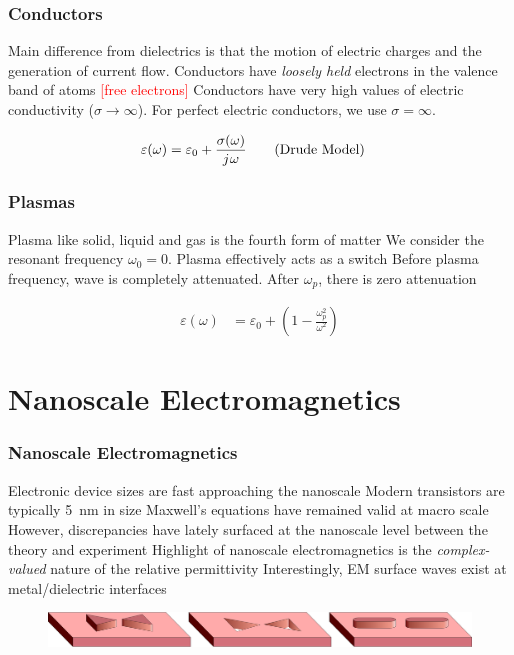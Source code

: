 \documentclass[10pt, compress]{beamer}
\renewcommand{\O}{\omega}  %
\newcommand{\E}{\varepsilon}  %
\renewcommand{\inf}{\infty}  %
\renewcommand{\j}{{j}\mkern1mu} %
\begin{document}
\begin{frame}
  \frametitle{Conductors} 
  \begin{outline}
    \1 Main difference from dielectrics is that the motion of electric charges and the  generation of current flow.
    \1 Conductors have \textit{loosely held} electrons in the valence band of atoms \textcolor{red}{[free electrons]}
    \1 Conductors have very high values of electric conductivity ($\sigma \to \inf$).
    \1 For perfect electric conductors, we use $\sigma = \inf$.
  \end{outline} 
    \begin{align*}
    \E (\O) &= \E_0 + \frac{\sigma (\O)}{\j \O} \tag{Drude Model}
  \end{align*}
\end{frame}

\begin{frame}
  \frametitle{Plasmas}
  \begin{outline}
    \1 Plasma like solid, liquid and gas is the fourth form of matter
    \1 We consider the resonant frequency $\O_0 = 0$.
    \1 Plasma effectively acts as a switch
      \2 Before plasma frequency, wave is completely attenuated.
      \2 After $\O_p$, there is zero attenuation
  \end{outline}
  \begin{align*}
    \E (\O) &= \E_0 + \left( 1 - \frac{\O_p^2}{\O^2} \right)
  \end{align*}
\end{frame}


\section{Nanoscale Electromagnetics}
\begin{frame}
  \frametitle{Nanoscale Electromagnetics}
  \begin{outline}
    \1 Electronic device sizes are fast approaching the nanoscale
    \2 Modern transistors are typically \SI{5}{\nm} in size
    \1 Maxwell's equations have remained valid at macro scale
    \2 However, discrepancies have lately surfaced at the nanoscale level between the theory and experiment
    \1 Highlight of nanoscale electromagnetics is the \textit{complex-valued} nature of the relative permittivity
    \1 Interestingly, EM surface waves exist at metal/dielectric interfaces
  \end{outline}
  \begin{figure}
    \centering  
    {\includegraphics[width=.9\textwidth]{nanoantennas.pdf}}
  \end{figure}
\end{frame}
\end{document}
